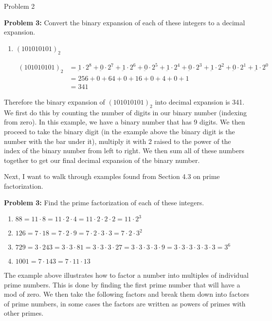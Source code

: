 \begin{problem}{Problem 2}
\begin{Highlight}[Solution]
        \noindent \textbf{Problem 3:} Convert the binary expansion of each of these integers to a decimal expansion.

        \begin{enumerate}[label = (\alph*), start = 3]
            \item $(1 0101 0101)_{2}$
            
            \begin{align*}
                (1 0101 0101)_{2} & = \underbar{1} \cdot 2^{8} + \underbar{0} \cdot 2^{7} + \underbar{1} \cdot 2^{6} + \underbar{0} \cdot 2^{5} + \underbar{1} \cdot 2^{4} + \underbar{0} \cdot 2^{3} + \underbar{1} \cdot 2^{2} + \underbar{0} \cdot 2^{1} + \underbar{1} \cdot 2^{0} \\
                & = 256 + 0 + 64 + 0 + 16 + 0 + 4 + 0 + 1 \\
                & = 341
            \end{align*}
        \end{enumerate}
        Therefore the binary expansion of $(1 0101 0101)_{2}$ into decimal expansion is 341. We first do this by counting the number of digits in our binary number (indexing from zero). In this 
        example, we have a binary number that has 9 digits. We then proceed to take the binary digit (in the example above the binary digit is the number with the bar under it), multiply it with 
        2 raised to the power of the index of the binary number from left to right. We then sum all of these numbers together to get our final decimal expansion of the binary number. \vspace*{1em}

        Next, I want to walk through examples found from Section 4.3 on prime factorization. \vspace*{1em}

        \noindent \textbf{Problem 3:} Find the prime factorization of each of these integers.

        \begin{enumerate}[label = (\alph*)]
            \item $88 = 11 \cdot 8 = 11 \cdot 2 \cdot 4 = 11 \cdot 2 \cdot 2 \cdot 2 = 11 \cdot 2^{3}$
            \item $126 = 7 \cdot 18 = 7 \cdot 2 \cdot 9 = 7 \cdot 2 \cdot 3 \cdot 3 = 7 \cdot 2 \cdot 3^{2}$
            \item $729 = 3 \cdot 243 = 3 \cdot 3 \cdot 81 = 3 \cdot 3 \cdot 3 \cdot 27 = 3 \cdot 3 \cdot 3 \cdot 3 \cdot 9 = 3 \cdot 3 \cdot 3 \cdot 3 \cdot 3 \cdot 3 = 3^{6}$
            \item $1001 = 7 \cdot 143 = 7 \cdot 11 \cdot 13$
        \end{enumerate}
        The example above illustrates how to factor a number into multiples of individual prime numbers. This is done by finding the first prime number that will have a mod of zero. We then take the 
        following factors and break them down into factors of prime numbers, in some cases the factors are written as powers of primes with other primes. \vspace*{1em}


\end{Highlight}
\end{problem}
